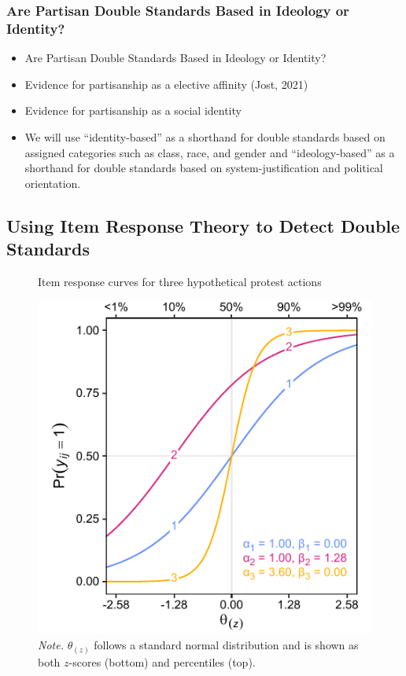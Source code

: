 \documentclass[12pt, letterpaper]{article}
\providecommand{\tightlist}{%
  \setlength{\itemsep}{0pt}\setlength{\parskip}{0pt}}
\begin{document}
\hypertarget{are-partisan-double-standards-based-in-ideology-or-identity}{%
\subsubsection{Are Partisan Double Standards Based in Ideology or
Identity?}\label{are-partisan-double-standards-based-in-ideology-or-identity}}

\begin{itemize}
\tightlist
\item
  Are Partisan Double Standards Based in Ideology or Identity?
\item
  Evidence for partisanship as a elective affinity (Jost, 2021)
\item
  Evidence for partisanship as a social identity
\item
  We will use ``identity-based'' as a shorthand for double standards
  based on assigned categories such as class, race, and gender and
  ``ideology-based'' as a shorthand for double standards based on
  system-justification and political orientation.
\end{itemize}

\hypertarget{using-item-response-theory-to-detect-double-standards}{%
\subsection{Using Item Response Theory to Detect Double
Standards}\label{using-item-response-theory-to-detect-double-standards}}

\begin{figure}
\centering
\caption{Item response curves for three hypothetical protest actions}
\includegraphics[scale=1]{../Scale Development/figures/figure-1}
\caption*{\textit{Note.} $\theta_{(z)}$ follows a standard normal distribution and is shown as both $z$-scores (bottom) and percentiles (top).}
\label{fig:f1}
\end{figure}
\end{document}

